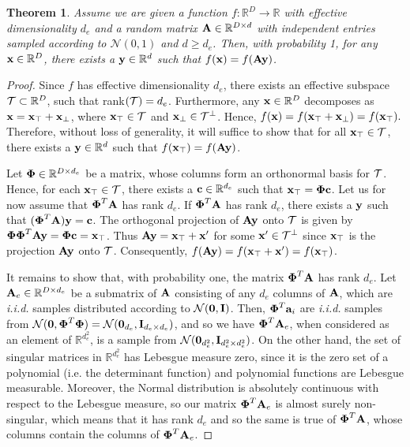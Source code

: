 \documentclass{article}
\newtheorem{theorem}[mydefinition]{Theorem}
\begin{document}
\begin{theorem}
\label{prop:1}
Assume we are given a function $f: \mathbb{R}^{D} \rightarrow \mathbb{R}$ with effective dimensionality $d_e$ and a random matrix $\mathbf{A} \in \mathbb{R}^{D\times d}$ with independent entries sampled according to $\mathcal{N}(0, 1)$ and $d\geq d_e$. Then, with probability 1, for any $\mathbf{x} \in \mathbb{R}^D$, there exists a $ \mathbf{y} \in \mathbb{R}^d$ such that $f(\mathbf{x}) = f(\mathbf{A}\mathbf{y})$.
\end{theorem}
\begin{proof}
Since $f$ has effective dimensionality $d_e$, there exists an effective subspace ${\cal T} \subset \mathbb{R}^D$, such that rank$({\cal T}) = d_e$. Furthermore, any $\mathbf{x} \in \mathbb{R}^D$ decomposes as
 $\mathbf{x} = \mathbf{x}_{\top} + \mathbf{x}_{\bot}$, where $\mathbf{x}_{\top} \in {\cal T}$ and $\mathbf{x}_{\bot} \in {\cal T}^{\bot}$. Hence, $f(\mathbf{x}) = f(\mathbf{x}_{\top} + \mathbf{x}_{\bot}) = f(\mathbf{x}_{\top}).$ Therefore, without loss of generality, it will suffice to show that for all $\mathbf{x}_{\top} \in {\cal T}$, there exists a $\mathbf{y}\in \mathbb{R}^d$ such that $f(\mathbf{x}_{\top}) = f(\mathbf{A}\mathbf{y})$.

Let $\boldsymbol{\Phi} \in \mathbb{R}^{D \times d_e}$ be a matrix, whose columns form an orthonormal basis for ${\cal T}$. Hence, for each $\mathbf{x}_{\top} \in {\cal T}$, there exists a $\mathbf{c} \in \mathbb{R}^{d_e}$ such that $\mathbf{x}_{\top} = \boldsymbol{\Phi} \mathbf{c}$. Let us for now assume that $\boldsymbol{\Phi}^{T}\mathbf{A}$ has rank $d_e$. If $\boldsymbol{\Phi}^{T}\mathbf{A}$ has rank $d_e$, there exists a $\mathbf{y}$ such that $(\boldsymbol{\Phi}^{T}\mathbf{A})\mathbf{y}=\mathbf{c}$. The orthogonal projection of $\mathbf{A}\mathbf{y}$ onto ${\cal T}$ is given by 
$\boldsymbol{\Phi} \boldsymbol{\Phi}^T \mathbf{A} \mathbf{y} = \boldsymbol{\Phi} \mathbf{c} = \mathbf{x}_{\top}$.
Thus $\mathbf{A}\mathbf{y} = \mathbf{x}_{\top} + \mathbf{x}'$ for some $\mathbf{x}' \in {\cal T}^{\bot}$ since $\mathbf{x}_{\top}$ is the projection $\mathbf{A}\mathbf{y}$ onto ${\cal T}$.
Consequently, $f(\mathbf{A}\mathbf{y}) = f(\mathbf{x}_{\top} + \mathbf{x}') = f(\mathbf{x}_{\top})$. 

It remains to show that, with probability one, the matrix $\boldsymbol{\Phi}^T \mathbf{A}$ has rank $d_e$.
Let $\mathbf{A}_{e} \in \mathbb{R}^{D\times d_e}$ be a submatrix of $\mathbf{A}$ consisting of any $d_e$ columns of $\mathbf{A}$, which are \emph{i.i.d.} samples distributed according to $\mathcal{N}(\mathbf{0}, \mathbf{I})$. Then, $\boldsymbol{\Phi}^T \mathbf{a}_{i}$ are \emph{i.i.d.} samples from $\mathcal{N}(\mathbf{0}, \boldsymbol{\Phi}^T \boldsymbol{\Phi}) = \mathcal{N}(\mathbf{0}_{d_e}, \mathbf{I}_{d_e\times d_e})$, and so we have $\boldsymbol{\Phi}^T\mathbf{A}_e$, when considered as an element of $\mathbb{R}^{d_e^2}$, is a sample from $\mathcal{N}(\mathbf{0}_{d_e^2}, \mathbf{I}_{d_e^2\times d_e^2})$. On the other hand, the set of singular matrices in $\mathbb{R}^{d_e^2}$ has Lebesgue measure zero, since it is the zero set of a polynomial (i.e. the determinant function) and polynomial functions are Lebesgue measurable. Moreover, the Normal distribution is absolutely continuous with respect to the Lebesgue measure, so our matrix $\boldsymbol{\Phi}^T \mathbf{A}_e$ is almost surely non-singular, which means that it has rank $d_e$ and so the same is true of $\boldsymbol{\Phi}^T \mathbf{A}$, whose columns contain the columns of $\boldsymbol{\Phi}^T \mathbf{A}_e$.
\end{proof}
\end{document}
